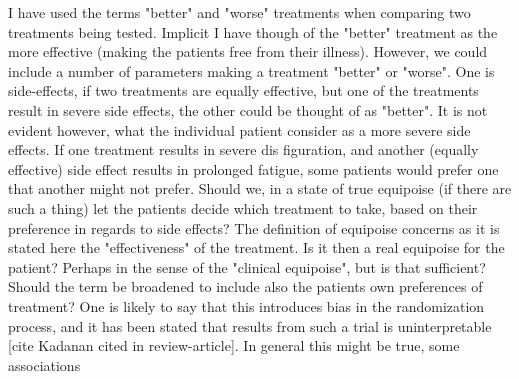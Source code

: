 \documentclass[12p]{article}
\begin{document}


I have used the terms "better" and "worse" treatments when comparing two treatments being tested.
Implicit I have though of the "better" treatment as the more effective (making the patients free from their illness).
However, we could include a number of parameters making a treatment "better" or "worse".
One is side-effects, if two treatments are equally effective, but one of the treatments result in severe side effects, the other could be thought of as "better".
It is not evident however, what the individual patient consider as a more severe side effects.
If one treatment results in severe dis figuration, and another (equally effective) side effect results in prolonged fatigue, some patients would prefer one that another might not prefer.
Should we, in a state of true equipoise (if there are such a thing) let the patients decide which treatment to take, based on their preference in regards to side effects?
The definition of equipoise concerns as it is stated here the "effectiveness" of the treatment.
Is it then a real equipoise for the patient?
Perhaps in the sense of the "clinical equipoise", but is that sufficient?
Should the term be broadened to include also the patients own preferences of treatment?
One is likely to say that this introduces bias in the randomization process, and it has been stated that results from such a trial is uninterpretable [cite Kadanan cited in review-article].
In general this might be true, some associations 



\end{document}
